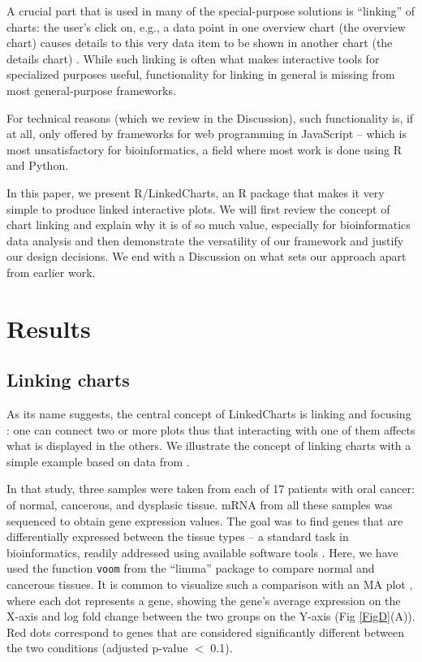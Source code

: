 \documentclass[twocolumn,10pt]{article}
\begin{document}
A crucial part that is used in many of the special-purpose solutions is ``linking'' of charts: the user's click on, e.g., a data point in one overview chart (the overview chart) causes details to this very data item to be shown in another chart (the details chart) \citep{buja_1991}. While such linking is often what makes interactive tools for specialized purposes useful, functionality for linking in general is missing from most general-purpose frameworks. 

For technical reasons (which we review in the Discussion), such functionality is, if at all, only offered by frameworks for web programming in JavaScript -- which is most unsatisfactory for bioinformatics, a field where most work is done using R and Python.

In this paper, we present R/LinkedCharts, an R package that makes it very simple to produce linked interactive plots. We will first review the concept of chart linking and explain why it is of so much value, especially for bioinformatics data analysis and then demonstrate the versatility of our framework and justify our design decisions. We end with a Discussion on what sets our approach apart from earlier work.

\section{Results}

\subsection{Linking charts}

As its name suggests, the central concept of LinkedCharts is linking and focusing \citep{buja_1991}: one can connect two or more plots thus that interacting with one of them affects what is displayed in the others. We illustrate the concept of linking charts with a simple example based on data from \citet{conway_2015}.

In that study, three samples were taken from each of 17 patients with oral cancer: of normal, cancerous, and dysplasic tissue. mRNA from all these samples was sequenced to obtain gene expression values. The goal was to find genes that are differentially expressed between the tissue types -- a standard task in bioinformatics, readily addressed using available software tools \citep{ritchie_2015, love_2014}. Here, we have used the function \texttt{voom} from the ``limma'' package \citep{law_2014} to compare normal and cancerous tissues. It is common to visualize such a comparison with an MA plot \citep{dudoit_2002}, where each dot represents a gene, showing the gene's average expression on the X-axis and log fold change between the two groups on the Y-axis (Fig \ref{FigD}(A)). Red dots correspond to genes that are considered significantly different between the two conditions (adjusted p-value $<$ 0.1). 
\end{document}
